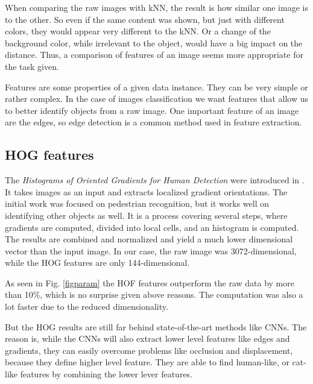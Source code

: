 When comparing the raw images with kNN, the result is how similar one image is to the other. So even if the same content was shown, but just with different colors, they would appear very different to the kNN. Or a change of the background color, while irrelevant to the object, would have a big impact on the distance. Thus, a comparison of features of an image seems more appropriate for the task given. 

Features are some properties of a given data instance. They can be very simple or rather complex. In the case of images classification we want features that allow us to better identify objects from a raw image. One important feature of an image are the edges, so edge detection is a common method used in feature extraction. 

\subsection{HOG features}
The \emph{Histograms of Oriented Gradients for Human Detection} were introduced in  \cite{Dalal:2005:HOG:1068507.1069007}. It takes images as an input and extracts localized gradient orientations. The initial work was focused on pedestrian recognition, but it works well on identifying other objects as well. It is a process covering several steps, where gradients are computed, divided into local cells, and an histogram is computed. The results are combined and normalized and yield a much lower dimensional vector than the input image. In our case, the raw image was 3072-dimensional, while the HOG features are only 144-dimensional. 

As seen in Fig. \ref{figparam} the HOF features outperform the raw data by more than 10\%, which is no surprise given above reasons. The computation was also a lot faster due to the reduced dimensionality.

But the HOG results are still far behind state-of-the-art methods like CNNs. The reason is, while the CNNs will also extract lower level features like edges and gradients, they can easily overcome problems like occlusion and displacement, because they define higher level feature. They are able to find human-like, or cat-like features by combining the lower lever features. 




